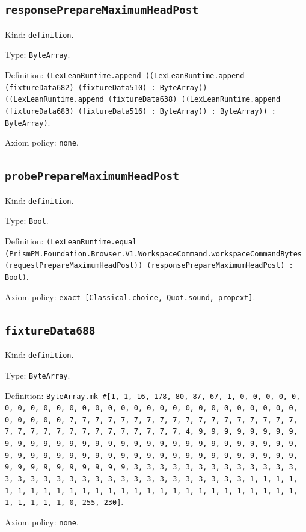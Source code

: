 \documentclass[11pt]{article}
\begin{document}
\subsection*{\texttt{responsePrepareMaximumHeadPost}}
\noindent Kind: \texttt{definition}.\par
\noindent Type: \texttt{ByteArray}.\par
\noindent Definition: \texttt{(LexLeanRuntime.append ((LexLeanRuntime.append (fixtureData682) (fixtureData510) : ByteArray)) ((LexLeanRuntime.append (fixtureData638) ((LexLeanRuntime.append (fixtureData683) (fixtureData516) : ByteArray)) : ByteArray)) : ByteArray)}.\par
\noindent Axiom policy: \texttt{none}.\par
\subsection*{\texttt{probePrepareMaximumHeadPost}}
\noindent Kind: \texttt{definition}.\par
\noindent Type: \texttt{Bool}.\par
\noindent Definition: \texttt{(LexLeanRuntime.equal (PrismPM.Foundation.Browser.V1.WorkspaceCommand.workspaceCommandBytes (requestPrepareMaximumHeadPost)) (responsePrepareMaximumHeadPost) : Bool)}.\par
\noindent Axiom policy: \texttt{exact [Classical.choice, Quot.sound, propext]}.\par
\subsection*{\texttt{fixtureData688}}
\noindent Kind: \texttt{definition}.\par
\noindent Type: \texttt{ByteArray}.\par
\noindent Definition: \texttt{ByteArray.mk \#[1, 1, 16, 178, 80, 87, 67, 1, 0, 0, 0, 0, 0, 0, 0, 0, 0, 0, 0, 0, 0, 0, 0, 0, 0, 0, 0, 0, 0, 0, 0, 0, 0, 0, 0, 0, 0, 0, 0, 0, 0, 7, 7, 7, 7, 7, 7, 7, 7, 7, 7, 7, 7, 7, 7, 7, 7, 7, 7, 7, 7, 7, 7, 7, 7, 7, 7, 7, 7, 7, 7, 7, 7, 4, 9, 9, 9, 9, 9, 9, 9, 9, 9, 9, 9, 9, 9, 9, 9, 9, 9, 9, 9, 9, 9, 9, 9, 9, 9, 9, 9, 9, 9, 9, 9, 9, 9, 9, 9, 9, 9, 9, 9, 9, 9, 9, 9, 9, 9, 9, 9, 9, 9, 9, 9, 9, 9, 9, 9, 9, 9, 9, 9, 9, 9, 9, 9, 9, 3, 3, 3, 3, 3, 3, 3, 3, 3, 3, 3, 3, 3, 3, 3, 3, 3, 3, 3, 3, 3, 3, 3, 3, 3, 3, 3, 3, 3, 3, 3, 3, 1, 1, 1, 1, 1, 1, 1, 1, 1, 1, 1, 1, 1, 1, 1, 1, 1, 1, 1, 1, 1, 1, 1, 1, 1, 1, 1, 1, 1, 1, 1, 1, 0, 255, 230]}.\par
\noindent Axiom policy: \texttt{none}.\par
\end{document}
